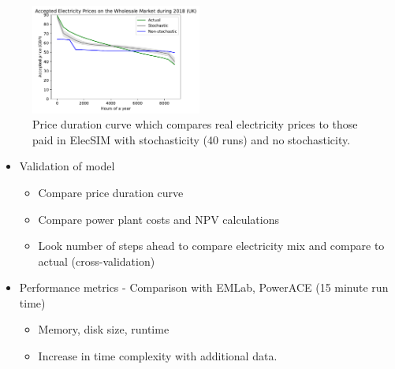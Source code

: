 

\begin{figure}[h]
	\begin{center}
		\includegraphics[width=0.5\textwidth]{figures/load_price_duration_curve_comparison.pdf}
		\caption{Price duration curve which compares real electricity prices to those paid in ElecSIM with stochasticity (40 runs) and no stochasticity.}
		\label{fig:price_duration_curve}
	\end{center}
\end{figure}



\begin{itemize}
	\item Validation of model 
	\begin{itemize}
		\item Compare price duration curve
		\item Compare power plant costs and NPV calculations
		\item Look number of steps ahead to compare electricity mix and compare to actual (cross-validation)
	\end{itemize} 
	\item Performance metrics - Comparison with EMLab, PowerACE (15 minute run time)
	\begin{itemize}
		\item Memory, disk size, runtime
		\item Increase in time complexity with additional data.
	\end{itemize}
\end{itemize}
